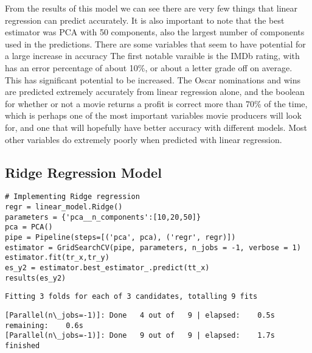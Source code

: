 \documentclass{article}
\begin{document}
From the results of this model we can see there are very few things that
linear regression can predict accurately. It is also important to note
that the best estimator was PCA with 50 components, also the largest
number of components used in the predictions. There are some variables
that seem to have potential for a large increase in accuracy The first
notable varaible is the IMDb rating, with has an error percentage of
about 10\%, or about a letter grade off on average. This has significant
potential to be increased. The Oscar nominations and wins are predicted
extremely accurately from linear regression alone, and the boolean for
whether or not a movie returns a profit is correct more than 70\% of the
time, which is perhaps one of the most important variables movie
producers will look for, and one that will hopefully have better
accuracy with different models. Most other variables do extremely poorly
when predicted with linear regression.

\hypertarget{linear-regression-model-analysis}{%
	\subsection{Ridge Regression Model
		}\label{ridge-regression-model-}}
	

\begin{lstlisting}
# Implementing Ridge regression
regr = linear_model.Ridge()
parameters = {'pca__n_components':[10,20,50]}
pca = PCA()
pipe = Pipeline(steps=[('pca', pca), ('regr', regr)])
estimator = GridSearchCV(pipe, parameters, n_jobs = -1, verbose = 1)
estimator.fit(tr_x,tr_y)
es_y2 = estimator.best_estimator_.predict(tt_x)
results(es_y2)
\end{lstlisting}

\begin{Verbatim}[commandchars=\\\{\}]
Fitting 3 folds for each of 3 candidates, totalling 9 fits

\end{Verbatim}

\begin{Verbatim}[commandchars=\\\{\}]
[Parallel(n\_jobs=-1)]: Done   4 out of   9 | elapsed:    0.5s remaining:    0.6s
[Parallel(n\_jobs=-1)]: Done   9 out of   9 | elapsed:    1.7s finished

\end{Verbatim}
\end{document}
